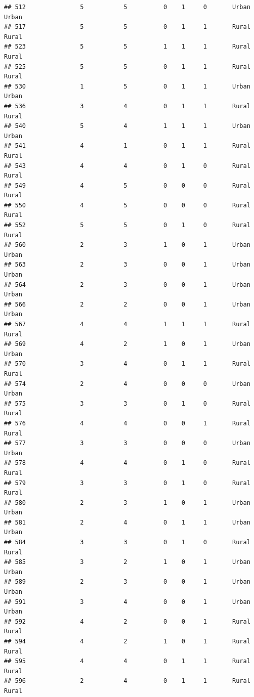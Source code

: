 \documentclass[
]{article}
\begin{document}
\begin{verbatim}
## 512               5           5          0    1     0       Urban Urban
## 517               5           5          0    1     1       Rural Rural
## 523               5           5          1    1     1       Rural Rural
## 525               5           5          0    1     1       Rural Rural
## 530               1           5          0    1     1       Urban Urban
## 536               3           4          0    1     1       Rural Rural
## 540               5           4          1    1     1       Urban Urban
## 541               4           1          0    1     1       Rural Rural
## 543               4           4          0    1     0       Rural Rural
## 549               4           5          0    0     0       Rural Rural
## 550               4           5          0    0     0       Rural Rural
## 552               5           5          0    1     0       Rural Rural
## 560               2           3          1    0     1       Urban Urban
## 563               2           3          0    0     1       Urban Urban
## 564               2           3          0    0     1       Urban Urban
## 566               2           2          0    0     1       Urban Urban
## 567               4           4          1    1     1       Rural Rural
## 569               4           2          1    0     1       Urban Urban
## 570               3           4          0    1     1       Rural Rural
## 574               2           4          0    0     0       Urban Urban
## 575               3           3          0    1     0       Rural Rural
## 576               4           4          0    0     1       Rural Rural
## 577               3           3          0    0     0       Urban Urban
## 578               4           4          0    1     0       Rural Rural
## 579               3           3          0    1     0       Rural Rural
## 580               2           3          1    0     1       Urban Urban
## 581               2           4          0    1     1       Urban Urban
## 584               3           3          0    1     0       Rural Rural
## 585               3           2          1    0     1       Urban Urban
## 589               2           3          0    0     1       Urban Urban
## 591               3           4          0    0     1       Urban Urban
## 592               4           2          0    0     1       Rural Rural
## 594               4           2          1    0     1       Rural Rural
## 595               4           4          0    1     1       Rural Rural
## 596               2           4          0    1     1       Rural Rural

\end{verbatim}
\end{document}
